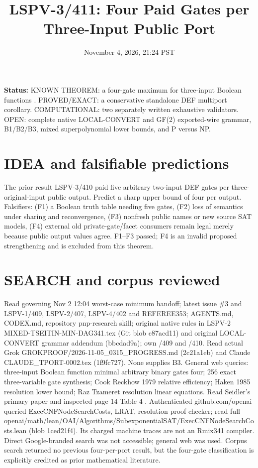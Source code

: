 \documentclass[11pt]{article}
\title{LSPV-3/411: Four Paid Gates per Three-Input Public Port}
\date{November 4, 2026, 21:24 PST}
\begin{document}
\maketitle
\noindent\textbf{Status:} KNOWN THEOREM: a four-gate maximum for three-input Boolean functions \cite{Seidler}. PROVED/EXACT: a conservative standalone DEF multiport corollary. COMPUTATIONAL: two separately written exhaustive validators. OPEN: complete native LOCAL-CONVERT and GF(2) exported-wire grammar, B1/B2/B3, mixed superpolynomial lower bounds, and P versus NP.

\section*{IDEA and falsifiable predictions}
\noindent The prior result LSPV-3/410 paid five arbitrary two-input DEF gates per three-original-input public output. Predict a sharp upper bound of four per output. Falsifiers: (F1) a Boolean truth table needing five gates, (F2) loss of semantics under sharing and reconvergence, (F3) nonfresh public names or new source SAT models, (F4) external old private-gate/facet consumers remain legal merely because public output values agree. F1--F3 passed; F4 is an invalid proposed strengthening and is excluded from this theorem.

\section*{SEARCH and corpus reviewed}
\noindent Read governing Nov 2 12:04 worst-case minimum handoff; latest issue \#3 and LSPV-1/409, LSPV-2/407, LSPV-4/402 and REFEREE353; AGENTS.md, CODEX.md, repository pnp-research skill; original native rules in LSPV-2 MIXED-TSEITIN-MIN-DAG341.tex (Git blob c87acd11) and original LOCAL-CONVERT grammar addendum (bbcdad9a); own /409 and /410. Read actual Grok GROKPROOF/2026-11-05_0315_PROGRESS.md (2c21a1eb) and Claude CLAUDE_TPORT-0002.tex (1f9fc727). None supplies B3. General web queries: three-input Boolean function minimal arbitrary binary gates four; 256 exact three-variable gate synthesis; Cook Reckhow 1979 relative efficiency; Haken 1985 resolution lower bound; Raz Tzameret resolution linear equations. Read Seidler's primary paper and inspected page 14 Table 4 \cite{Seidler}. Authenticated github.com/openai queried ExecCNFNodeSearchCosts, LRAT, resolution proof checker; read full openai/math/lean/OAI/Algorithms/SubexponentialSAT/ExecCNFNodeSearchCosts.lean (blob 1ced21f4). Its charged machine traces are not an Rmix341 compiler. Direct Google-branded search was not accessible; general web was used. Corpus search returned no previous four-per-port result, but the four-gate classification is explicitly credited as prior mathematical literature.
\end{document}
